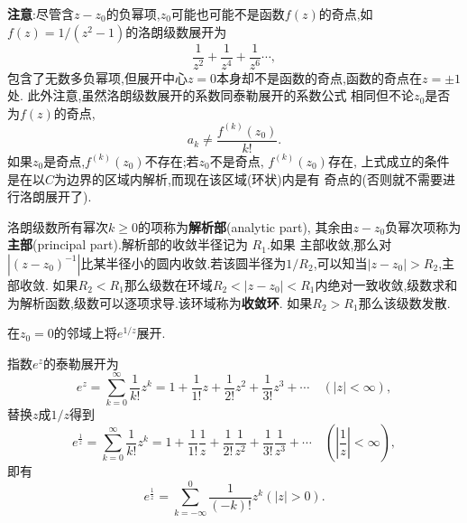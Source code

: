 \textbf{注意}:尽管含$z-z_0$的负幂项,$z_0$可能也可能不是函数$f(z)$的奇点,如$f(z) = 1/(z^2-1)$的洛朗级数展开为
$$
\frac{1}{z^2} + \frac{1}{z^4} + \frac{1}{z^6}\cdots,
$$
包含了无数多负幂项,但展开中心$z=0$本身却不是函数的奇点,函数的奇点在$z=\pm 1$处. 此外注意,虽然洛朗级数展开的系数同泰勒展开的系数公式
相同但不论$z_0$是否为$f(z)$的奇点,
$$a_k \neq \frac{f^{(k)}(z_0)}{k!}.
$$
如果$z_0$是奇点,$f^{(k)}(z_0)$不存在;若$z_0$不是奇点, $f^{(k)}(z_0)$存在, 上式成立的条件是在以$C$为边界的区域内解析,而现在该区域(环状)内是有
奇点的(否则就不需要进行洛朗展开了).

洛朗级数所有幂次$k\geq 0$的项称为\textbf{解析部}(analytic part), 其余由$z-z_0$负幂次项称为\textbf{主部}(principal part).解析部的收敛半径记为
$R_1$.如果
主部收敛,那么对$|(z-z_0)^{-1}|$比某半径小的圆内收敛.若该圆半径为$1/R_2$,可以知当$|z-z_0|> R_2$,主部收敛.
如果$R_2 < R_1$那么级数在环域$R_2 < |z- z_0| < R_1$内绝对一致收敛,级数求和为解析函数,级数可以逐项求导.该环域称为\textbf{收敛环}.
如果$R_2 > R_1$那么该级数发散.

\begin{example}
在$z_0 = 0$的邻域上将$e^{1/z}$展开.
\end{example}
\begin{solution}
指数$e^z$的泰勒展开为
\[
    e^z=\sum_{k=0}^{\infty} \frac{1}{k !} z^k=1+\frac{1}{1 !} z+\frac{1}{2 !} z^2+\frac{1}{3 !} z^3+\cdots \quad(|z|<\infty),    
\]
替换$z$成$1/z$得到
\[
    e^{\frac{1}{z}}=\sum_{k=0}^{\infty} \frac{1}{k !} z^k=1+\frac{1}{1 !} \frac{1}{z}+\frac{1}{2 !} \frac{1}{z^2}+\frac{1}{3 !} \frac{1}{z^3}+\cdots \quad(|\frac{1}{z}|<\infty),    
\]
即有
\[
e^{\frac{1}{z}} = \sum_{k=-\infty}^{0} \frac{1}{(-k)!} z^k ( |z| > 0) .
\]
\end{solution}